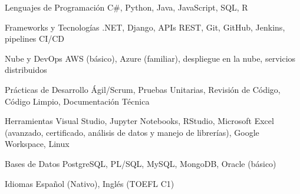 
\begin{cvskills}

  \cvskill
    {Lenguajes de Programación}
    {C\#, Python, Java, JavaScript, SQL, R}

  \cvskill
    {Frameworks y Tecnologías}
    {.NET, Django, APIs REST, Git, GitHub, Jenkins, pipelines CI/CD}

  \cvskill
    {Nube y DevOps}
    {AWS (básico), Azure (familiar), despliegue en la nube, servicios distribuidos}

  \cvskill
    {Prácticas de Desarrollo}
    {Ágil/Scrum, Pruebas Unitarias, Revisión de Código, Código Limpio, Documentación Técnica}

  \cvskill
    {Herramientas}
    {Visual Studio, Jupyter Notebooks, RStudio, Microsoft Excel (avanzado, certificado, análisis de datos y manejo de librerías), Google Workspace, Linux}

  \cvskill
    {Bases de Datos}
    {PostgreSQL, PL/SQL, MySQL, MongoDB, Oracle (básico)}

  \cvskill
    {Idiomas}
    {Español (Nativo), Inglés (TOEFL C1)}

\end{cvskills}
